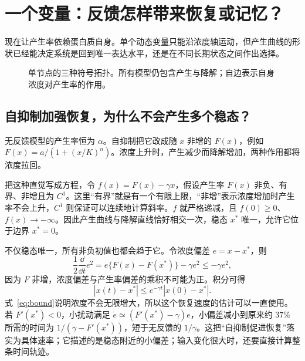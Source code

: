 \chapter{一个变量：反馈怎样带来恢复或记忆？}
现在让产生率依赖蛋白质自身。单个动态变量只能沿浓度轴运动，但产生曲线的形状已经能决定系统是回到唯一表达水平，还是在不同长期状态之间作出选择。

\begin{figure}[H]\centering
{}
\caption{单节点的三种符号拓扑。所有模型仍包含产生与降解；自边表示自身浓度对产生率的作用。}
\end{figure}
\section{自抑制加强恢复，为什么不会产生多个稳态？}
无反馈模型的产生率恒为 $\alpha$。自抑制把它改成随 $x$ 非增的 $F(x)$，例如 $F(x)=a/(1+(x/K)^n)$。浓度上升时，产生减少而降解增加，两种作用都将浓度拉回。

把这种直觉写成方程，令 $f(x)=F(x)-\gamma x$，假设产生率 $F(x)$ 非负、有界、非增且为 $C^1$。这里“有界”就是有一个有限上限，“非增”表示浓度增加时产生率不会上升，$C^1$ 则保证可以连续地计算斜率。$f$ 就严格递减，且 $f(0)\geq0$、$f(x)\to-\infty$。因此产生曲线与降解直线恰好相交一次，稳态 $x^*$ 唯一，允许它位于边界 $x^*=0$。

不仅稳态唯一，所有非负初值也都会趋于它。令浓度偏差 $e=x-x^*$，则
\[
\frac12\frac{\dd}{\dd t}e^2=e\{F(x)-F(x^*)\}-\gamma e^2\leq-\gamma e^2,
\]
因为 $F$ 非增，浓度偏差与产生率偏差的乘积不可能为正。积分可得
\[
|x(t)-x^*|\leq e^{-\gamma t}|x(0)-x^*|.
\]
式~\eqref{eq:bound}说明浓度不会无限增大，所以这个恢复速度的估计可以一直使用。若 $F'(x^*)<0$，小扰动满足 $\dot e\simeq(F'(x^*)-\gamma)e$，小偏差减小到原来约 $37\%$ 所需的时间为 $1/(\gamma-F'(x^*))$，短于无反馈的 $1/\gamma$。这把“自抑制促进恢复”落实为具体速率；它描述的是稳态附近的小偏差；输入变化很大时，还要直接计算整条时间轨迹。

